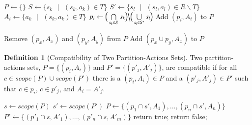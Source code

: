 \documentclass[]{elsarticle}
\theoremstyle{definition}
\newtheorem{definition2}{Definition}
\theoremstyle{definition}
\newcommand{\se}{\text{ }}
\begin{document}
\begin{algorithm}[H]
\SetAlgoLined
{}
$P \leftarrow \{\}$\;
{
   $S   \leftarrow \{s_k \se|\se (s_k,a_k) \in T\}$             \;
   $S'  \leftarrow \{s_l \se|\se (s_l,a_l) \in R\backslash T\}$ \;
   $A_i \leftarrow \{a_k \se|\se (s_k,a_k) \in T\}$             \; 
   $p_i \leftarrow \Big(\bigcap\limits_{s_k \in  S} s_k \Big)  
                   \Big\backslash 
                   \Big(\bigcup\limits_{s_l \in S'} s_l \Big)$   \;
   {
      Add $(p_i, A_i)$ to $P$ \;
   }
}

{
   {
      Remove $(p_x,A_x)$ and $(p_y,A_y)$ from $P$\;
      Add $(p_x \cup p_y, A_x)$ to $P$ \;
   }
}
\caption{$GetPartitionActionsSet(R):$ \\Get the Partition-Actions Set that corresponds to rule
        transition set $R$}
\end{algorithm}


\begin{definition2}[Compatibility of Two Partition-Actions Sets] Two partition-actions sets, 
$P=\{(p_i,A_i)\}$ and $P'=\{(p'_j,A'_j)\}$, are compatible if for all $c \in scope(P) \cup 
scope(P')$ there is a $(p_i, A_i)\in P$ and a $(p'_j,A'_j) \in P'$  such that $c\in p_i$,
$c\in p'_j$, and $A_i=A'_j$.
\end{definition2}

\begin{algorithm}[H]
\SetAlgoLined
{}
$s  \leftarrow scope(P)$\;
$s' \leftarrow scope(P')$\;
$P  \leftarrow \{(p_1\cap s', A_1),...,(p_n\cap s', A_n)\}$\;
$P' \leftarrow \{(p'_1\cap s, A'_1),...,(p'_n\cap s, A'_m)\}$\;
{
   return true;
}
{
   return false;
}
\caption{$Compatible(P,P')$\\
Return $true$ if partition-actions set $P$ is compatible with partition-actions set $P'$}
\end{algorithm}
\end{document}
